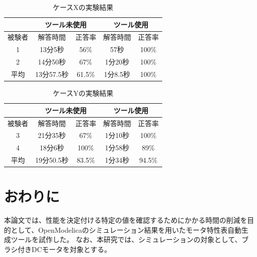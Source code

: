 \documentclass[uplatex, 10pt, a4p]{jsarticle}
\begin{document}
\begin{table}[tp]
  \begin{center}
    \caption{ケースXの実験結果}
    \label{resultX}
    \begin{tabular}{c|c|c|c|c|}
    \cline{2-5}
                              & \multicolumn{2}{c|}{ツール未使用} & \multicolumn{2}{c|}{ツール使用} \\ \hline
    \multicolumn{1}{|c||}{被験者} & 解答時間           & 正答率          & 解答時間           & 正答率         \\ \hline\hline
    \multicolumn{1}{|c||}{1}   & 13分5秒           & 56\%         & 57秒           & 100\%         \\ \hline
    \multicolumn{1}{|c||}{2}   & 14分50秒          & 67\%          & 1分20秒          & 100\%         \\ \hline\hline
    \multicolumn{1}{|c||}{平均}   & 13分57.5秒          & 61.5\%          & 1分8.5秒          & 100\%         \\ \hline
    \end{tabular}
  \end{center}
\end{table}

\begin{table}[tp]
  \begin{center}
    \caption{ケースYの実験結果}
    \label{resultY}
    \begin{tabular}{c|c|c|c|c|}
    \cline{2-5}
                              & \multicolumn{2}{c|}{ツール未使用} & \multicolumn{2}{c|}{ツール使用} \\ \hline
    \multicolumn{1}{|c||}{被験者} & 解答時間           & 正答率          & 解答時間           & 正答率         \\ \hline\hline
    \multicolumn{1}{|c||}{3}   & 21分35秒           & 67\%         & 1分10秒           & 100\%         \\ \hline
    \multicolumn{1}{|c||}{4}   & 18分6秒          & 100\%          & 1分58秒          & 89\%         \\ \hline\hline
    \multicolumn{1}{|c||}{平均}   & 19分50.5秒          & 83.5\%          & 1分34秒          & 94.5\%         \\ \hline
    \end{tabular}
  \end{center}
\end{table}

\section{おわりに}
本論文では、性能を決定付ける特定の値を確認するためにかかる時間の削減を目的として、OpenModelicaのシミュレーション結果を用いたモータ特性表自動生成ツールを試作した。
なお、本研究では、シミュレーションの対象として、ブラシ付きDCモータを対象とする。
\end{document}
